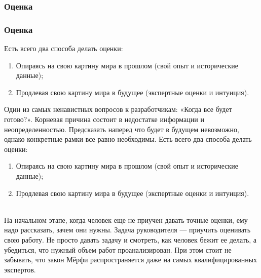 \documentclass{../industrial-development}
\begin{document}
\subsubsection{Оценка}
\begin{frame} \frametitle{Оценка}
Есть всего два способа делать оценки:
  \begin{enumerate}
	\item Опираясь на свою картину мира в прошлом (свой опыт и исторические данные); 
	\item Продлевая свою картину мира в будущее (экспертные оценки и интуиция). 
  \end{enumerate}
\end{frame}
\lecturenotes
Один из самых ненавистных вопросов к разработчикам: «Когда все будет готово?». Корневая причина состоит в недостатке информации и неопределенностью. Предсказать наперед что будет в будущем невозможно, однако конкретные рамки все равно необходимы. Есть всего два способа делать оценки:\\
\begin{enumerate}
	\item Опираясь на свою картину мира в прошлом (свой опыт и исторические данные); 
	\item Продлевая свою картину мира в будущее (экспертные оценки и интуиция). 
\end{enumerate}\\
На начальном этапе, когда человек еще не приучен давать точные оценки, ему надо рассказать, зачем они нужны. Задача руководителя — приучить оценивать свою работу. Не просто давать задачу и смотреть, как человек бежит ее делать, а убедиться, что нужный объем работ проанализирован. При этом стоит не забывать, что закон Мёрфи распространяется даже на самых квалифицированных экспертов.
\end{document}

